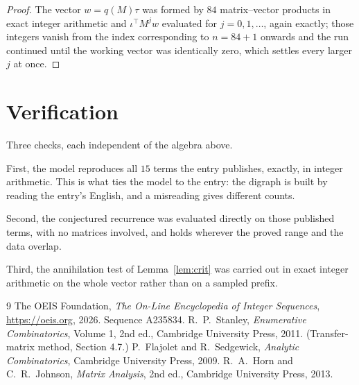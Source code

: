 \documentclass[11pt,a4paper]{article}
\theoremstyle{plain}
\theoremstyle{definition}
\begin{document}
\begin{proof}
The vector $w=q(M)\tau$ was formed by $84$ matrix--vector products in exact integer
arithmetic and $\iota^{\!\top}M^{j}w$ evaluated for $j=0,1,\dots$, again exactly; those
integers vanish from the index corresponding to $n=84+1$ onwards and the run continued
until the working vector was identically zero, which settles every larger $j$ at once.
\end{proof}

\section{Verification}

Three checks, each independent of the algebra above.

First, the model reproduces all $15$ terms the entry publishes, exactly, in integer
arithmetic. This is what ties the model to the entry: the digraph is built by reading the
entry's English, and a misreading gives different counts.

Second, the conjectured recurrence was evaluated directly on those published terms, with no
matrices involved, and holds wherever the proved range and the data overlap.

Third, the annihilation test of Lemma~\ref{lem:crit} was carried out in exact integer
arithmetic on the whole vector rather than on a sampled prefix.

\begin{thebibliography}{9}
 The OEIS Foundation, \emph{The On-Line Encyclopedia of Integer
Sequences}, \url{https://oeis.org}, 2026. Sequence A235834.
 R.~P.~Stanley, \emph{Enumerative Combinatorics}, Volume 1, 2nd ed.,
Cambridge University Press, 2011. (Transfer-matrix method, Section 4.7.)
 P.~Flajolet and R.~Sedgewick, \emph{Analytic Combinatorics}, Cambridge
University Press, 2009.
 R.~A.~Horn and C.~R.~Johnson, \emph{Matrix Analysis}, 2nd ed., Cambridge
University Press, 2013.
\end{thebibliography}
\end{document}
